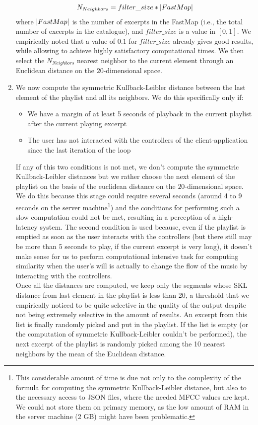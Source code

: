 \begin{enumerate}
\begin{equation}
N_{Neighbors} = filter\_size * \lvert FastMap\rvert
\end{equation} 
where $\lvert FastMap\rvert$ is the number of excerpts in the FastMap (i.e., the total number of excerpts in the catalogue), and $filter\_size$ is a value in $[0, 1]$. We empirically noted that a value of $0.1$ for $filter\_size$ already gives good results, while allowing to achieve highly satisfactory computational times. We then select the $N_{Neighbors}$ nearest neighbor to the current element through an Euclidean distance on the $20$-dimensional space. 
\item We now compute the symmetric Kullback-Leibler distance between the last element of the playlist and all its neighbors. We do this specifically only if:
\begin{itemize}
\item We have a margin of at least 5 seconds of playback in the current playlist after the current playing excerpt
\item The user has not interacted with the controllers of the client-application since the last iteration of the loop
\end{itemize}
If any of this two conditions is not met, we don't compute the symmetric Kullback-Leibler distances but we rather choose the next element of the playlist on the basis of the euclidean distance on the $20$-dimensional space. We do this because this stage could require several seconds (around 4 to 9 seconds on the server machine\footnote{This considerable amount of time is due not only to the complexity of the formula for computing the symmetric Kullback-Leibler distance, but also to the necessary access to JSON files, where the needed MFCC values are kept. We could not store them on primary memory, as the low amount of RAM in the server machine (2 GB) might have been problematic.}) and the conditions for performing such a slow computation could not be met, resulting in a perception of a high-latency system. The second condition is used because, even if the playlist is emptied as soon as the user interacts with the controllers (but there still may be more than 5 seconds to play, if the current excerpt is very long), it doesn't make sense for us to perform computational intensive task for computing similarity when the user's will is actually to change the flow of the music by interacting with the controllers. \\ Once all the distances are computed, we keep only the segments whose SKL distance from last element in the playlist is less than 20, a threshold that we empirically noticed to be quite selective in the quality of the output despite not being extremely selective in the amount of results. An excerpt from this list is finally randomly picked and put in the playlist. If the list is empty (or the computation of symmetric Kullback-Leibler couldn't be performed), the next excerpt of the playlist is randomly picked among the 10 nearest neighbors by the mean of the Euclidean distance. 
\end{enumerate}

